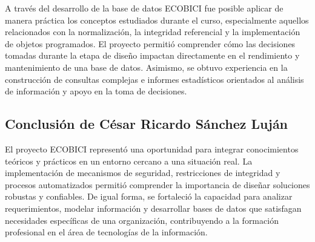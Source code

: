 A través del desarrollo de la base de datos ECOBICI fue posible aplicar de manera práctica los conceptos estudiados durante el curso, especialmente aquellos relacionados con la normalización, la integridad referencial y la implementación de objetos programados. El proyecto permitió comprender cómo las decisiones tomadas durante la etapa de diseño impactan directamente en el rendimiento y mantenimiento de una base de datos. Asimismo, se obtuvo experiencia en la construcción de consultas complejas e informes estadísticos orientados al análisis de información y apoyo en la toma de decisiones.

\subsection{Conclusión de César Ricardo Sánchez Luján}

El proyecto ECOBICI representó una oportunidad para integrar conocimientos teóricos y prácticos en un entorno cercano a una situación real. La implementación de mecanismos de seguridad, restricciones de integridad y procesos automatizados permitió comprender la importancia de diseñar soluciones robustas y confiables. De igual forma, se fortaleció la capacidad para analizar requerimientos, modelar información y desarrollar bases de datos que satisfagan necesidades específicas de una organización, contribuyendo a la formación profesional en el área de tecnologías de la información.
